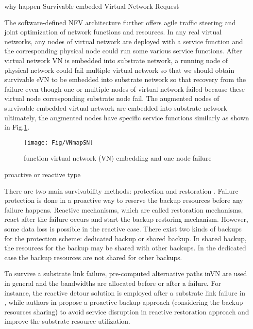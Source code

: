 why happen Survivable embeded Virtual Network Request

The software-defined NFV architecture further offers agile traffic steering and joint optimization of network functions and resources.
In any real virtual networks, any nodes of virtual network  are deployed with a service function and the corresponding physical node could run some various service functions. After virtual network VN is embedded into substrate network, a running node of physical network could fail multiple virtual network so that we should obtain survivable eVN to be embedded into substrate network so that recovery from the failure even though one or multiple nodes of virtual network failed because these virtual node corresponding substrate node fail. The augmented nodes of survivable embedded virtual network are embedded into substrate network ultimately, the augmented nodes have specific service functions similarly as shown in Fig.\ref{fig:VNmapSN}.

\begin{figure}
  \centering
  \texttt{[image: Fig/VNmapSN]}\\
  \caption{function virtual network (VN) embedding and one node failure}\label{fig:VNmapSN}
\end{figure}


proactive or reactive type

There are two main survivability methods: protection and restoration \cite{ramamurthy2003survivable}. Failure protection is done in a proactive way to reserve the backup resources before any failure happens. Reactive mechanisms, which are called restoration mechanisms, react after the failure occurs and start the backup restoring mechanism. However, some data loss is possible in the reactive case. There exist two kinds of backups for the protection scheme: dedicated backup or shared backup. In shared backup, the resources for the backup may be shared with other backups. In the dedicated case the backup resources are not shared for other backups.


To survive a substrate link failure, pre-computed alternative paths inVN are used in general and the bandwidths are allocated before or after a failure. For instance, the reactive detour solution is employed after a substrate link failure in \cite{rahman2010survivable}, while authors in \cite{rahman2013svne,guo2011shared} propose a proactive backup approach (considering the backup resources sharing) to avoid service disruption in reactive restoration approach and improve the substrate resource utilization.


